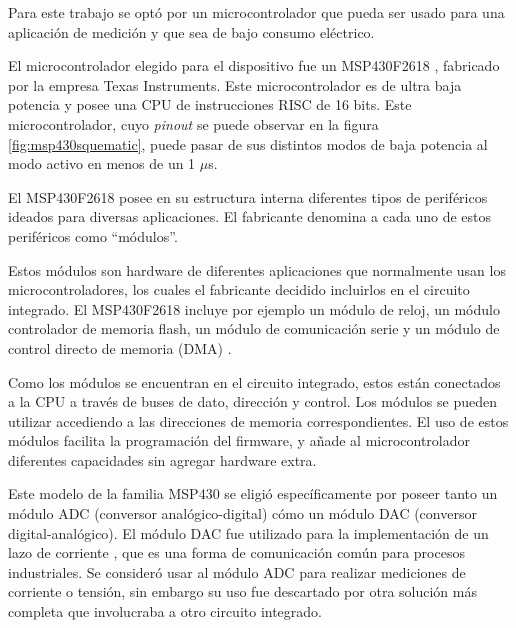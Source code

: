 Para este trabajo se optó por un microcontrolador que pueda ser usado para una aplicación de medición y que sea de bajo consumo eléctrico.


El microcontrolador elegido para el dispositivo fue un MSP430F2618 \cite{msp430freff}, fabricado por la empresa Texas Instruments. Este microcontrolador es de ultra baja potencia y posee una CPU de instrucciones RISC de 16 bits. Este microcontrolador, cuyo \textit{pinout} se puede observar en la figura \ref{fig:msp430squematic}, puede pasar de sus distintos modos de baja potencia al modo activo en menos de un 1 $\mu$s.



El MSP430F2618 posee en su estructura interna diferentes tipos de periféricos ideados para diversas aplicaciones. El fabricante denomina a cada uno de estos periféricos como \textquotedblleft módulos\textquotedblright .
 
Estos módulos son hardware de diferentes aplicaciones que normalmente usan los microcontroladores, los cuales el fabricante decidido incluirlos en el circuito integrado. El MSP430F2618 incluye por ejemplo un módulo de reloj, un módulo controlador de memoria flash, un módulo de comunicación serie y un módulo de control directo de memoria (DMA) \cite{msp430slau144j}. 

Como los módulos se encuentran en el circuito integrado, estos están conectados a la CPU a través de buses de dato, dirección y control. Los módulos se pueden utilizar  accediendo a las direcciones de memoria correspondientes. El uso de estos módulos facilita la programación del firmware, y añade al microcontrolador diferentes capacidades sin agregar hardware extra.


Este modelo de la familia MSP430 \citep{msp430family} se eligió específicamente por poseer tanto un módulo ADC (conversor analógico-digital) cómo un módulo DAC (conversor digital-analógico). El módulo DAC fue utilizado para la implementación de un lazo de corriente \citep{liptak2018instrument}, que es una forma de comunicación común para procesos industriales. Se consideró usar al módulo ADC para realizar mediciones de corriente o tensión, sin embargo su uso fue descartado por otra solución más completa que involucraba a otro circuito integrado.

